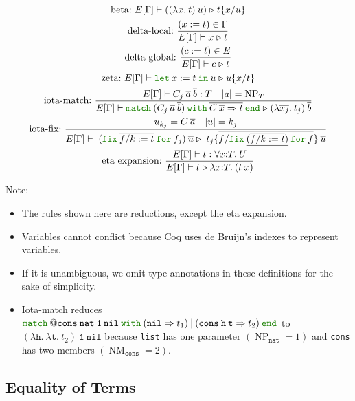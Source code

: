 \documentclass[a4paper,fleqn]{article}
\def\coq{\textrm{Coq}}
\newcommand{\kwlet}{\mbox{\color{mygreen}\ttfamily let}}
\newcommand{\kwin}{\mbox{\color{mygreen}\ttfamily in}}
\newcommand{\kwmatch}{\mbox{\color{mygreen}\ttfamily match}}
\newcommand{\kwwith}{\mbox{\color{mygreen}\ttfamily with}}
\newcommand{\kwend}{\mbox{\color{mygreen}\ttfamily end}}
\newcommand{\kwfix}{\mbox{\color{mygreen}\ttfamily fix}}
\newcommand{\kwfor}{\mbox{\color{mygreen}\ttfamily for}}
\newcommand{\lam}[2]{\lambda #1.\:#2}
\newcommand{\lamT}[3]{\lambda #1\mathord{:}#2.\:#3}
\newcommand{\prodT}[3]{\forall #1\mathord{:}#2.\:#3}
\newcommand{\letin}[3]{\kwlet\:#1:=#2\:\kwin\:#3}
\newcommand{\omatch}[2]{\kwmatch\:#1\:\kwwith\:{#2}\:\kwend}
\newcommand{\ofix}[2]{\kwfix\:{#1}\:\kwfor\:{#2}}
\DeclareMathOperator{\NP}{NP} %
\DeclareMathOperator{\NM}{NM} %
\newcommand{\WT}[4]{\ensuremath{#1[#2] \vdash #3 : #4}}
\newcommand{\WTE}[3]{\WT{E}{#1}{#2}{#3}}
\newcommand{\WTEG}[2]{\WTE{\Gamma}{#1}{#2}}
\newcommand{\subst}[3]{#1\{#2/#3\}}
\newcommand{\substm}[3]{#1\{\overline{#2/#3}\}}
\newcommand{\reltri}{\mathrel{\triangleright}}
\newcommand{\rep}[1]{\overline{#1}}
\begin{document}
\begin{gather*}
  \text{beta:}~
    E[\Gamma] \vdash ((\lam{x}{t})\:u) \reltri \subst{t}{x}{u} \\
  \text{delta-local:}~
    \dfrac{(x:=t) \in \Gamma}{E[\Gamma] \vdash x \reltri t} \\
  \text{delta-global:}~
    \dfrac{(c:=t) \in E}{E[\Gamma] \vdash c \reltri t} \\
  \text{zeta:}~
    E[\Gamma] \vdash \letin{x}{t}{u} \reltri \subst{u}{x}{t} \\
  \text{iota-match:}~
    \dfrac
    {
      E[\Gamma] \vdash C_j\:\rep{a}\:\rep{b} : T \quad
      \text{$|a| = \NP_T$}
    }{
      E[\Gamma] \vdash
      \omatch{(C_j\:\rep{a}\:\rep{b})}{\rep{C\:\rep{x}\Rightarrow t}}
      \reltri
      (\lam{\rep{x_j}}{t_j})\:\rep{b}
    } \\
  \text{iota-fix:}~
    \dfrac{
      u_{k_j} = C\:\rep{a} \quad
      |u| = k_j
    }{
      E[\Gamma] \vdash\; (\ofix{\rep{f/k:=t}}{f_j})\:\rep{u} \reltri\; \substm{t_j}{f}{\ofix{\underline{(\rep{f/k:=t})}}{f}} \: \rep{u}
    } \\
  \text{eta expansion:}~
    \dfrac{\WTEG{t}{\prodT{x}{T}{U}}}{E[\Gamma] \vdash t \reltri \lamT{x}{T}{(t\:x)}}
\end{gather*}
{\small Note:
\begin{itemize}
  \item The rules shown here are reductions, except the eta expansion.
  \item Variables cannot conflict because \coq{} uses de Bruijn's indexes to represent variables.
  \item If it is unambiguous, we omit type annotations in these definitions for the sake of simplicity.
  \item Iota-match reduces $\kwmatch\:\mathtt{@cons\:nat\:1\:nil}\:\kwwith\:(\mathtt{nil} \Rightarrow t_1)\:|\:(\mathtt{cons}\:\mathtt{h}\:\mathtt{t} \Rightarrow t_2)\:\kwend$ to $(\lam{\mathtt{h}}{\lam{\mathtt{t}}{t_2}})\:\mathtt{1\:nil}$
    because \lstinline!list! has one parameter $(\NP_\mathtt{nat}=1)$ and \lstinline!cons! has two members $(\NM_\mathtt{cons}=2)$.
\end{itemize}}

\subsection{Equality of Terms}\label{sec:equality-of-terms}
\end{document}
